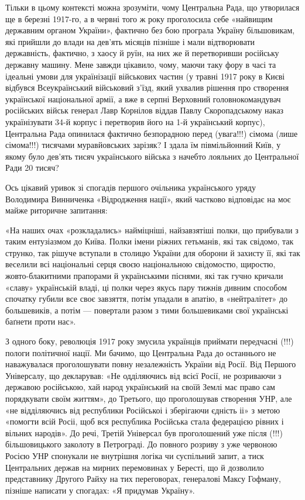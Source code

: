 Тільки в цьому контексті можна зрозуміти, чому Центральна Рада, що утворилася
ще в березні 1917-го, а в червні того ж року проголосила себе «найвищим
державним органом України», фактично без бою програла Україну більшовикам, які
прийшли до влади на дев’ять місяців пізніше і мали відтворювати державність,
фактично, з хаосу й руїн, на них же й перетворивши російську державну машину.
Мене завжди цікавило, чому, маючи таку фору в часі та ідеальні умови для
українізації військових частин (у травні 1917 року в Києві відбувся
Всеукраїнський військовий з’їзд, який ухвалив рішення про створення української
національної армії, а вже в серпні Верховний головнокомандувач російських
військ генерал Лавр Корнілов віддав Павлу Скоропадському наказ українізувати
34-й корпус і перетворив його на 1-й український корпус), Центральна Рада
опинилася фактично безпорадною перед (увага!!!) сімома (лише сімома!!!)
тисячами муравйовських зарізяк? І здала їм півмільйонний Київ, у якому було
дев’ять тисяч українського війська з начебто лояльних до Центральної Ради 20
тисяч?

Ось цікавий уривок зі спогадів першого очільника українського уряду Володимира
Винниченка «Відродження нації», який частково відповідає на моє майже риторичне
запитання:

\begin{zzquote}
«На наших очах «розкладались» найміцніші, найзавзятіші полки, що прибували з
таким ентузіазмом до Київа. Полки імени ріжних гетьманів, які так свідомо, так
струнко, так рішуче вступали в столицю України для оборони й захисту її, які
так веселили всі національні серця своєю національною свідомостю, щиростю,
жовто-блакитними прапорами й українськими піснями, які так гучно кричали
«славу» українській владі, ці полки через якусь пару тижнів дивним способом
спочатку губили все своє завзяття, потім упадали в апатію, в «нейтралітет» до
большевиків, а потім — повертали разом з тими большевиками свої українські
баґнети проти нас».	
\end{zzquote}

З одного боку, революція 1917 року змусила українців приймати передчасні (!!!)
пологи політичної нації. Ми бачимо, що Центральна Рада до останнього не
наважувалася проголошувати повну незалежність України від Росії. Від Першого
Універсалу, що декларував: «Не одділяючись від всієї Росії, не розриваючи з
державою російською, хай народ український на своїй Землі має право сам
порядкувати своїм життям», до Третього, що проголошував створення УНР, але «не
відділяючись від республики Російськоі і зберігаючи єдність іі» з метою
«помогти всій Росіі, щоб вся республика Російська стала федерацією рівних і
вільних народів». До речі, Третій Універсал був проголошений уже після (!!!)
більшовицького заколоту в Петрограді. До повного розриву з уже червоною Росією
УНР спонукали не внутрішня логіка чи суспільний запит, а тиск Центральних
держав на мирних перемовинах у Бересті, що й дозволило представнику Другого
Райху на тих переговорах, генералові Максу Гофману, пізніше написати у
спогадах: «Я придумав Україну».

